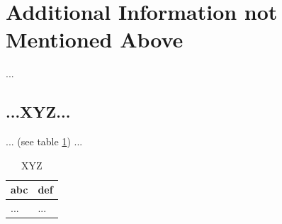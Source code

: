 \section{Additional Information not Mentioned Above}\label{sec:last}
%
...
%
%
%
\subsection{...XYZ...}\label{sec:last-xyz}
%
... (see table \ref{tbl:last-xyz}) ...

\begin{table}[H]
    \begin{tabularx}{\textwidth}{l|l}
        \textbf{abc} & \textbf{def} \\
        \hline
        ... & ...\\
    \end{tabularx}
    \caption{XYZ\label{tbl:last-xyz}}
\end{table}

